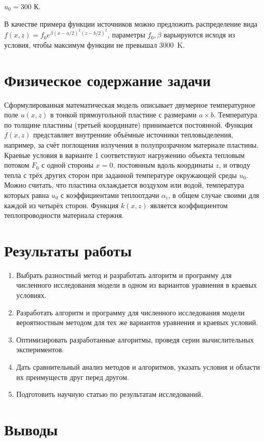 $u_0 = 300$ К.

В качестве примера функции источников можно предложить распределение вида $f(x, z) = f_0 e^{\beta(x - a/2)^2(z - b/2)^2}$, параметры $f_0, \beta$ варьируются исходя из условия, чтобы максимум функции не превышал $3000$~K.

\section{Физическое содержание задачи}

Сформулированная математическая модель описывает двумерное температурное поле $u(x, z)$ в тонкой прямоугольной пластине с размерами $a \times b$.
Температура по толщине пластины (третьей координате) принимается постоянной.
Функция $f(x, z)$ представляет внутренние объёмные источники тепловыделения, например, за счёт поглощения излучения в полупрозрачном материале пластины.
Краевые условия в варианте 1 соответствуют нагружению объекта тепловым потоком $F_0$ с одной стороны $x = 0$, постоянным вдоль координаты $z$, и отводу тепла с трёх других сторон при заданной температуре окружающей среды $u_0$.
Можно считать, что пластина охлаждается воздухом или водой, температура которых равна $u_0$ с коэффициентами теплоотдачи $\alpha_i$, в общем случае своими для каждой из четырёх сторон.
Функция $k(x, z)$ является коэффициентом теплопроводности материала стержня.

\section{Результаты работы}

\begin{enumerate}
	\item Выбрать разностный метод и разработать алгоритм и программу для численного исследования модели в одном из вариантов уравнения в краевых условиях.
	\item Разработать алгоритм и программу для численного исследования модели вероятностным методом для тех же вариантов уравнения и краевых условий.
	\item Оптимизировать разработанные алгоритмы, проведя серии вычислительных экспериментов.
	\item Дать сравнительный анализ методов и алгоритмов, указать условия и области их преимуществ друг перед другом.
	\item Подготовить научную статью по результатам исследований.
\end{enumerate}


\section{Выводы}
